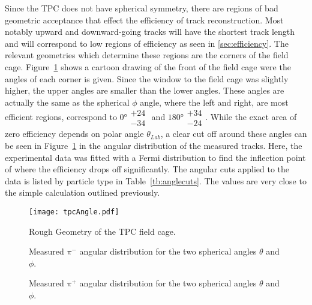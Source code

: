 Since the TPC does not have spherical symmetry, there are regions of bad geometric acceptance that effect the efficiency of track reconstruction. Most notably upward and downward-going tracks will have the shortest track length and will correspond to low regions of efficiency as seen in \ref{sec:efficiency}. The relevant geometries which determine these regions are the corners of the field cage. Figure~\ref{fig:angleEffExplanation} shows a cartoon drawing of the front of the field cage were the angles of each corner is given. Since the window to the field cage was slightly higher, the upper angles are smaller than the lower angles. These angles are actually the same as the spherical $\phi$ angle, where the left and right, are most efficient regions, correspond to  $\ang{0}\substack{+24 \\ -34}$ and $\ang{180}\substack{+34 \\ -24}$.  While the exact area of zero efficiency depends on polar angle $\theta_{Lab}$, a clear cut off around these angles can be seen in Figure~\ref{fig:angleEffExplanation} in the angular distribution of the measured tracks. Here, the experimental data was fitted with a Fermi distribution to find the inflection point of where the efficiency drops off significantly. The angular cuts applied to the data is listed by particle type in Table~\ref{tb:anglecuts}. The values are very close to the simple calculation outlined previously. 


\begin{figure}[!htb]
\centering
\texttt{[image: tpcAngle.pdf]}
\caption{Rough Geometry of the TPC field cage.}
\label{fig:angleEffExplanation}
\end{figure}


\begin{figure}[!htb]%
    \centering
    \qquad

	\caption{Measured $\pi^-$ angular distribution for the two spherical angles $\theta$ and $\phi$.}
    \label{fig:pim}
\end{figure}


\begin{figure}[!htb]%
    \centering
    \qquad
     \caption{Measured $\pi^+$ angular distribution for the two spherical angles $\theta$ and $\phi$.}
        \label{fig:pip}
\end{figure}


